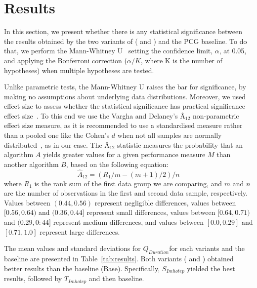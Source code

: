 \section{Results}
\label{sec:Results}

In this section, we present whether there is any statistical significance between the results obtained by the two variants of \ApproachName{} (\simhotep{} and \timhotep{}) and the PCG baseline. To do that, we perform the Mann-Whitney U~\cite{mann1947test} setting the confidence limit, $\alpha$, at 0.05, and applying the Bonferroni correction ($\alpha/K$, where K is the number of hypotheses) when multiple hypotheses are tested.  

Unlike parametric tests, the Mann-Whitney U raises the bar for significance, by making no assumptions about underlying data distributions.
Moreover, we used effect size to assess whether the statistical significance has practical significance effect size~\cite{Arcuri2014}. To this end we use the Vargha and Delaney's Â$_{12}$ non-parametric effect size measure, as it is recommended to use a standardised measure rather than a pooled one like the Cohen's $d$ when not all samples are normally distributed~\cite{Arcuri2014}, as in our case. 
The Â$_{12}$ statistic measures the probability that an algorithm $A$ yields greater values for a given performance measure $M$ than another algorithm $B$, based on the following equation: 
\begin{equation}
\hat{A}_{12} = (R_1/m - (m + 1)/2)/n 
\end{equation}
\noindent where $R_1$ is the rank sum of the first data group we are comparing, and $m$ and $n$ are the number of observations in the first and second data sample, respectively. Values between $(0.44, 0.56)$ represent negligible differences, values between $[0.56, 0.64)$ and $(0.36, 0.44]$ represent small differences, values between $[0.64, 0.71)$ and $(0.29, 0:44]$ represent medium differences, and values between $[0.0, 0.29]$ and $[0.71, 1.0]$ represent large differences.

The mean values and standard deviations for $Q_{Duration}$for each \ApproachName{} variants and the baseline are presented in Table~\ref{tab:results}. Both variants (\simhotep{} and \timhotep{}) obtained better results than the baseline (Base). Specifically, $S_{Imhotep}$ yielded the best results, followed by $T_{Imhotep}$ and then baseline.

